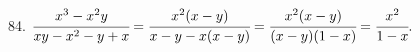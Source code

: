 84. $\cfrac{x^3-x^2y}{xy-x^2-y+x}=\cfrac{x^2(x-y)}{x-y-x(x-y)}=\cfrac{x^2(x-y)}{(x-y)(1-x)}=\cfrac{x^2}{1-x}.$\\
